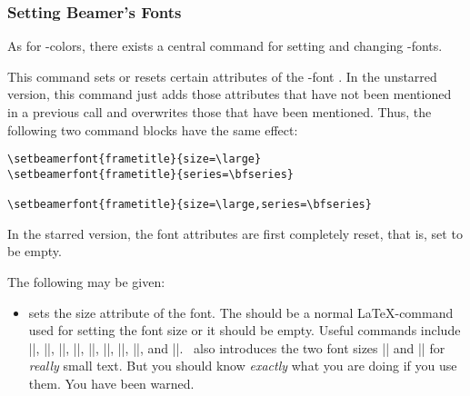 \subsubsection{Setting Beamer's Fonts}

As for \beamer-colors, there exists a central command for setting and
changing \beamer-fonts.

\begin{command}{\setbeamerfont\opt{|*|}}
  This command sets or resets certain attributes of the \beamer-font . In the unstarred version, this command just adds those attributes that have not been mentioned in a previous call and overwrites those that have been mentioned. Thus, the following two command blocks have the same effect:

  \example
\begin{verbatim}
\setbeamerfont{frametitle}{size=\large}
\setbeamerfont{frametitle}{series=\bfseries}

\setbeamerfont{frametitle}{size=\large,series=\bfseries}
\end{verbatim}
  In the starred version, the font attributes are first completely reset, that is, set to be empty.

  The following  may be given:
  \begin{itemize}
    \item {} sets the size attribute of the \beamer font. The  should be a normal \LaTeX-command used for setting the font size or it should be empty. Useful commands include |\tiny|, |\scriptsize|, |\footnotesize|, |\small|, |\normalsize|, |\large|, |\Large|, |\huge|, and |\Huge|. \beamer\ also introduces the two font sizes |\Tiny| and |\TINY| for \emph{really} small text. But you should know \emph{exactly} what you are doing if you use them. You have been warned.


\end{itemize}
\end{command}
